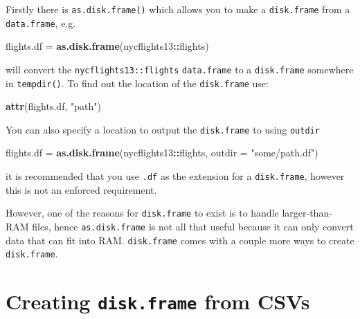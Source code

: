 \documentclass[]{book}
\newenvironment{Shaded}{\begin{snugshade}}{\end{snugshade}}
\newcommand{\DataTypeTok}[1]{\textcolor[rgb]{0.13,0.29,0.53}{#1}}
\newcommand{\KeywordTok}[1]{\textcolor[rgb]{0.13,0.29,0.53}{\textbf{#1}}}
\newcommand{\NormalTok}[1]{#1}
\newcommand{\OperatorTok}[1]{\textcolor[rgb]{0.81,0.36,0.00}{\textbf{#1}}}
\newcommand{\StringTok}[1]{\textcolor[rgb]{0.31,0.60,0.02}{#1}}
\begin{document}
Firstly there is \texttt{as.disk.frame()} which allows you to make a \texttt{disk.frame} from a \texttt{data.frame}, e.g.

\begin{Shaded}
\begin{Highlighting}[]
\NormalTok{flights.df =}\StringTok{ }\KeywordTok{as.disk.frame}\NormalTok{(nycflights13}\OperatorTok{::}\NormalTok{flights)}
\end{Highlighting}
\end{Shaded}

will convert the \texttt{nycflights13::flights} \texttt{data.frame} to a \texttt{disk.frame} somewhere in \texttt{tempdir()}. To find out the location of the \texttt{disk.frame} use:

\begin{Shaded}
\begin{Highlighting}[]
\KeywordTok{attr}\NormalTok{(flights.df, }\StringTok{"path"}\NormalTok{)}
\end{Highlighting}
\end{Shaded}

You can also specify a location to output the \texttt{disk.frame} to using \texttt{outdir}

\begin{Shaded}
\begin{Highlighting}[]
\NormalTok{flights.df =}\StringTok{ }\KeywordTok{as.disk.frame}\NormalTok{(nycflights13}\OperatorTok{::}\NormalTok{flights, }\DataTypeTok{outdir =} \StringTok{"some/path.df"}\NormalTok{)}
\end{Highlighting}
\end{Shaded}

it is recommended that you use \texttt{.df} as the extension for a \texttt{disk.frame}, however this is not an enforced requirement.

However, one of the reasons for \texttt{disk.frame} to exist is to handle larger-than-RAM files, hence \texttt{as.disk.frame} is not all that useful because it can only convert data that can fit into RAM. \texttt{disk.frame} comes with a couple more ways to create \texttt{disk.frame}.

\hypertarget{creating-disk.frame-from-csvs}{%
\section{\texorpdfstring{Creating \texttt{disk.frame} from CSVs}{Creating disk.frame from CSVs}}\label{creating-disk.frame-from-csvs}}
\end{document}
